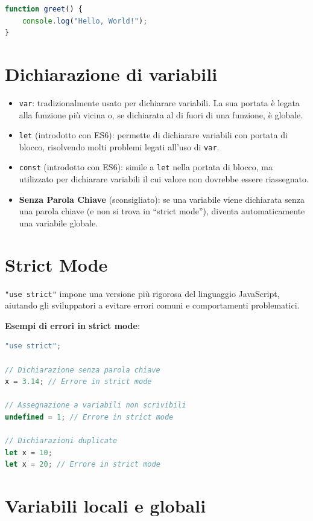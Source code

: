 \begin{lstlisting}[language=JavaScript]
function greet() {
    console.log("Hello, World!");
}
\end{lstlisting}

\section{Dichiarazione di variabili}

\begin{itemize}
    \item \texttt{var}: tradizionalmente usato per dichiarare variabili. La sua portata è legata alla funzione più vicina o, se dichiarata al di fuori di una funzione, è globale.
    \item \texttt{let} (introdotto con ES6): permette di dichiarare variabili con portata di blocco, risolvendo molti problemi legati all'uso di \texttt{var}.
    \item \texttt{const} (introdotto con ES6): simile a \texttt{let} nella portata di blocco, ma utilizzato per dichiarare variabili il cui valore non dovrebbe essere riassegnato.
    \item \textbf{Senza Parola Chiave} (sconsigliato): se una variabile viene dichiarata senza una parola chiave (e non si trova in ``strict mode''), diventa automaticamente una variabile globale.
\end{itemize}

\section{Strict Mode}

\texttt{"use strict"} impone una versione più rigorosa del linguaggio JavaScript, aiutando gli sviluppatori a evitare errori comuni e comportamenti problematici.

\textbf{Esempi di errori in strict mode}:

\begin{lstlisting}[language=JavaScript]
"use strict";

// Dichiarazione senza parola chiave
x = 3.14; // Errore in strict mode

// Assegnazione a variabili non scrivibili
undefined = 1; // Errore in strict mode

// Dichiarazioni duplicate
let x = 10;
let x = 20; // Errore in strict mode
\end{lstlisting}

\section{Variabili locali e globali}

